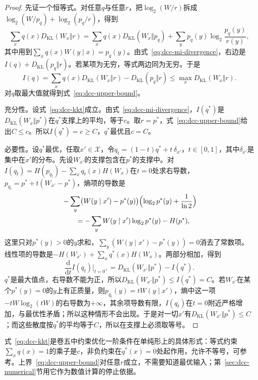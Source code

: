 \begin{proof}
先证一个恒等式。对任意$q$与任意$r$，把$\log_2(W/r)$拆成$\log_2(W/p_q)+\log_2(p_q/r)$，得到
\[
 \sum_{x}q(x)D_{\mathrm{KL}}(W_x\Vert r)=\sum_xq(x)D_{\mathrm{KL}}(W_x\Vert p_q)+\sum_{y}p_q(y)\log_2\frac{p_q(y)}{r(y)} ,
\]
其中用到$\sum_xq(x)W(y\mid x)=p_q(y)$。由式~\eqref{eq:dcc-mi-divergence}，右边是$I(q)+D_{\mathrm{KL}}(p_q\Vert r)$。若某项为无穷，等式两边同为无穷。于是
\[
 I(q)=\sum_xq(x)D_{\mathrm{KL}}(W_x\Vert r)-D_{\mathrm{KL}}(p_q\Vert r)\leq\max_xD_{\mathrm{KL}}(W_x\Vert r) .
\]
对$q$取最大值就得到式~\eqref{eq:dcc-upper-bound}。

充分性。设式~\eqref{eq:dcc-kkt}成立。由式~\eqref{eq:dcc-mi-divergence}，$I(q^{*})$是$D_{\mathrm{KL}}(W_x\Vert p^{*})$在$q^{*}$支撑上的平均，等于$c$。取$r=p^{*}$，式~\eqref{eq:dcc-upper-bound}给出$C\leq c$。所以$I(q^{*})=c\geq C$，$q^{*}$最优且$c=C$。

必要性。设$q^{*}$最优，任取$x'\in\mathcal{X}$，令$q_t=(1-t)q^{*}+t\,\delta_{x'}$，$t\in[0,1]$，其中$\delta_{x'}$是集中在$x'$的分布。先设$W_{x'}$的支撑包含在$p^{*}$的支撑中。对$I(q_t)=H(p_{q_t})-\sum_xq_t(x)H(W_x)$在$t=0$处求右导数，$p_{q_t}=p^{*}+t(W_{x'}-p^{*})$，熵项的导数是
\[
 \begin{aligned}
 &-\sum_{y}\bigl(W(y\mid x')-p^{*}(y)\bigr)\Bigl(\log_2p^{*}(y)+\frac{1}{\ln2}\Bigr)\\
 &\qquad=-\sum_yW(y\mid x')\log_2p^{*}(y)-H(p^{*}) ,
 \end{aligned}
\]
这里只对$p^{*}(y)>0$的$y$求和，$\sum_y(W(y\mid x')-p^{*}(y))=0$消去了常数项。线性项的导数是$-H(W_{x'})+\sum_xq^{*}(x)H(W_x)$。两部分相加，得到
\[
 \frac{\mathrm{d}}{\mathrm{d}t}I(q_t)\Big|_{t=0^{+}}=D_{\mathrm{KL}}(W_{x'}\Vert p^{*})-I(q^{*}) .
\]
$q^{*}$是最大值点，右导数不能为正，所以$D_{\mathrm{KL}}(W_{x'}\Vert p^{*})\leq I(q^{*})=C$。若$W_{x'}$在某个$p^{*}(y)=0$的$y$上有正质量，则$p_{q_t}(y)=tW(y\mid x')$，熵中这一项$-tW\log_2(tW)$的右导数为$+\infty$，其余项导数有限，$I(q_t)$在$t=0$附近严格增加，与最优性矛盾；所以这种情形不会出现。于是对一切$x'$有$D_{\mathrm{KL}}(W_{x'}\Vert p^{*})\leq C$；而这些散度按$q^{*}$的平均等于$C$，所以在支撑上必须取等号。
\end{proof}

式~\eqref{eq:dcc-kkt}是卷五中约束优化一阶条件在单纯形上的具体形式：等式约束$\sum_xq(x)=1$的乘子是$c$，非负约束在$q^{*}(x)=0$处起作用，允许不等号，可参考。上界~\eqref{eq:dcc-upper-bound}对任意$r$成立，不需要知道最优输入；第~\ref{sec:dcc-numerical}节用它作为数值计算的停止依据。

